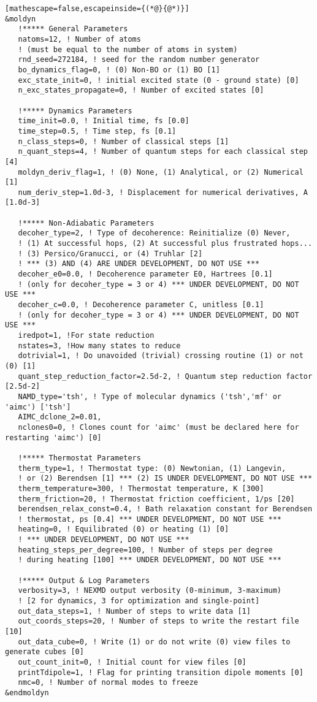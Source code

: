 \begin{lstlisting}[mathescape=false,escapeinside={(*@}{@*)}]
&moldyn
   !***** General Parameters
   natoms=12, ! Number of atoms
   ! (must be equal to the number of atoms in system)
   rnd_seed=272184, ! seed for the random number generator
   bo_dynamics_flag=0, ! (0) Non-BO or (1) BO [1]
   exc_state_init=0, ! initial excited state (0 - ground state) [0]
   n_exc_states_propagate=0, ! Number of excited states [0]

   !***** Dynamics Parameters
   time_init=0.0, ! Initial time, fs [0.0]
   time_step=0.5, ! Time step, fs [0.1]
   n_class_steps=0, ! Number of classical steps [1]
   n_quant_steps=4, ! Number of quantum steps for each classical step [4]
   moldyn_deriv_flag=1, ! (0) None, (1) Analytical, or (2) Numerical [1]
   num_deriv_step=1.0d-3, ! Displacement for numerical derivatives, A [1.0d-3]

   !***** Non-Adiabatic Parameters
   decoher_type=2, ! Type of decoherence: Reinitialize (0) Never,
   ! (1) At successful hops, (2) At successful plus frustrated hops...
   ! (3) Persico/Granucci, or (4) Truhlar [2]
   ! *** (3) AND (4) ARE UNDER DEVELOPMENT, DO NOT USE ***
   decoher_e0=0.0, ! Decoherence parameter E0, Hartrees [0.1]
   ! (only for decoher_type = 3 or 4) *** UNDER DEVELOPMENT, DO NOT USE ***
   decoher_c=0.0, ! Decoherence parameter C, unitless [0.1]
   ! (only for decoher_type = 3 or 4) *** UNDER DEVELOPMENT, DO NOT USE ***
   iredpot=1, !For state reduction
   nstates=3, !How many states to reduce
   dotrivial=1, ! Do unavoided (trivial) crossing routine (1) or not (0) [1]
   quant_step_reduction_factor=2.5d-2, ! Quantum step reduction factor [2.5d-2]
   NAMD_type='tsh', ! Type of molecular dynamics ('tsh','mf' or 'aimc') ['tsh']
   AIMC_dclone_2=0.01,
   nclones0=0, ! Clones count for 'aimc' (must be declared here for restarting 'aimc') [0]

   !***** Thermostat Parameters
   therm_type=1, ! Thermostat type: (0) Newtonian, (1) Langevin,
   ! or (2) Berendsen [1] *** (2) IS UNDER DEVELOPMENT, DO NOT USE ***
   therm_temperature=300, ! Thermostat temperature, K [300]
   therm_friction=20, ! Thermostat friction coefficient, 1/ps [20]
   berendsen_relax_const=0.4, ! Bath relaxation constant for Berendsen
   ! thermostat, ps [0.4] *** UNDER DEVELOPMENT, DO NOT USE ***
   heating=0, ! Equilibrated (0) or heating (1) [0]
   ! *** UNDER DEVELOPMENT, DO NOT USE ***
   heating_steps_per_degree=100, ! Number of steps per degree
   ! during heating [100] *** UNDER DEVELOPMENT, DO NOT USE ***

   !***** Output & Log Parameters
   verbosity=3, ! NEXMD output verbosity (0-minimum, 3-maximum)
   ! [2 for dynamics, 3 for optimization and single-point]
   out_data_steps=1, ! Number of steps to write data [1]
   out_coords_steps=20, ! Number of steps to write the restart file [10]
   out_data_cube=0, ! Write (1) or do not write (0) view files to generate cubes [0]
   out_count_init=0, ! Initial count for view files [0]
   printTdipole=1, ! Flag for printing transition dipole moments [0]
   nmc=0, ! Number of normal modes to freeze
&endmoldyn


\end{lstlisting}
